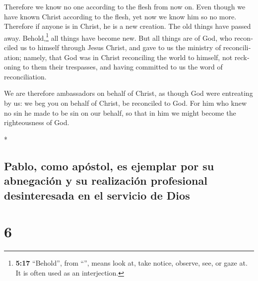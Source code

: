 \begin{paracol}{2}
\begin{otherlanguage}{english}
 Therefore we know no one according to the flesh from now
on. Even though we have known Christ according to the flesh, yet now we
know him so no more.  Therefore if anyone is in Christ,
he is a new creation. The old things have passed away.
Behold,\footnote{\textbf{5:17} ``Behold'', from ``'', means
  look at, take notice, observe, see, or gaze at. It is often used as an
  interjection.} all things have become new.  But all
things are of God, who reconciled us to himself through Jesus Christ,
and gave to us the ministry of reconciliation;  namely,
that God was in Christ reconciling the world to himself, not reckoning
to them their trespasses, and having committed to us the word of
reconciliation.

 We are therefore ambassadors on behalf of Christ, as
though God were entreating by us: we beg you on behalf of Christ, be
reconciled to God.  For him who knew no sin he made to be
sin on our behalf, so that in him we might become the righteousness of
God.

\end{otherlanguage}

\switchcolumn[0]*

\hypertarget{pablo-como-apuxf3stol-es-ejemplar-por-su-abnegaciuxf3n-y-su-realizaciuxf3n-profesional-desinteresada-en-el-servicio-de-dios}{%
\subsection{Pablo, como apóstol, es ejemplar por su abnegación y su
realización profesional desinteresada en el servicio de
Dios}\label{pablo-como-apuxf3stol-es-ejemplar-por-su-abnegaciuxf3n-y-su-realizaciuxf3n-profesional-desinteresada-en-el-servicio-de-dios}}

\hypertarget{section-10}{%
\section{6}\label{section-10}}


\end{paracol}
